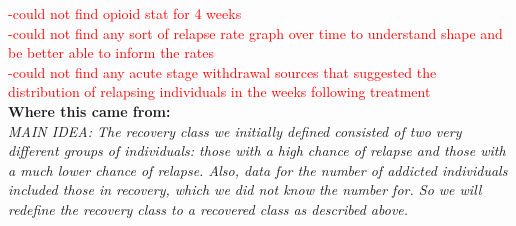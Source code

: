 \documentclass[12pt]{article}
\begin{document}

\textcolor{red}{-could not find opioid stat for 4 weeks \\
-could not find any sort of relapse rate graph over time to understand shape and be better able to inform the rates \\
-could not find any acute stage withdrawal sources that suggested the distribution of relapsing individuals in the weeks following treatment}  \\



\textbf{Where this came from:} \\

\textit{MAIN IDEA: The recovery class we initially defined consisted of two very different groups of individuals: those with a high chance of relapse and those with a much lower chance of relapse. Also, data for the number of addicted individuals included those in recovery, which we did not know the number for. So we will redefine the recovery class to a recovered class as described above.} \\
\end{document}
